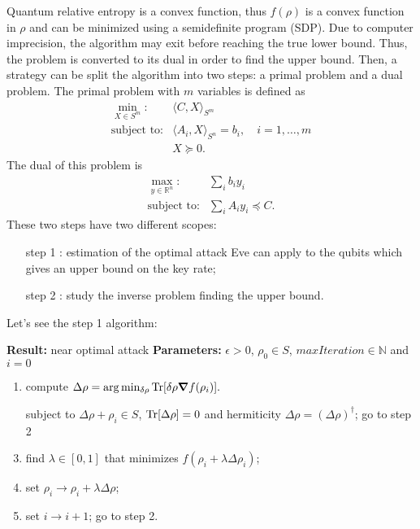 \documentclass{article}
\begin{document}
    Quantum relative entropy is a convex function, thus \(f(\rho)\) is a convex function in \(\rho\) and can be minimized using a semidefinite program (SDP).
    Due to computer imprecision, the algorithm may exit before reaching the true lower bound.
    Thus, the problem is converted to its dual in order to find the upper bound.
    Then, a strategy can be split the algorithm into two steps: a primal problem and a dual problem.
    The primal problem with \(m\) variables is defined as
    \begin{equation}
        \begin{aligned}
            \min_{X\in S^m}   :& \langle C,X\rangle_{S^m}\\
            \text{subject to}:& \langle A_i,X\rangle_{S^n}=b_i, \quad i=1,\ldots,m\\
                         &X\succeq 0.
        \end{aligned}
    \end{equation}       
    The dual of this problem is
    \begin{equation}
        \begin{aligned}
            \max_{y\in\mathbb{R}^n}:& \sum_i b_i y_i \\
            \text{subject to} :& \sum_i A_i y_i \preceq C.
        \end{aligned}
    \end{equation}
    These two steps have two different scopes:
    \begin{enumerate}
        \item[step 1]: estimation of the optimal attack Eve can apply to the qubits which gives an upper bound on the key rate;
        \item[step 2]: study the inverse problem finding the upper bound.
    \end{enumerate}
    Let's see the step 1 algorithm:
    \begin{algorithm}
        \caption{}
        \begin{algorithmic}[1]
        \Statex \textbf{Result:} near optimal attack
        \Statex \textbf{Parameters:} \(\epsilon > 0\), \(\rho_0\in S\), \(maxIteration\in\mathbb{N}\) and \(i=0\)
        \begin{enumerate}
            \item compute \(\Delta\rho = \arg\min_{\delta\rho}\Tr[ \delta\rho \grad f(\rho_i) ].\)
            \item[] subject to \(\Delta\rho + \rho_i \in S\), \(\Tr[\Delta\rho]=0\) and hermiticity \(\Delta\rho=(\Delta\rho)^{\dagger}\);
             go to step 2\EndIf
            \item find \(\lambda\in[0,1]\) that minimizes \(f(\rho_i+\lambda\Delta\rho_i)\);
            \item set $\rho_i \to \rho_i + \lambda \Delta\rho$;
            \item set $i \to i + 1$;
             go to step 2\EndIf.
        \end{enumerate}
        \end{algorithmic}
    \end{algorithm}
\end{document}
